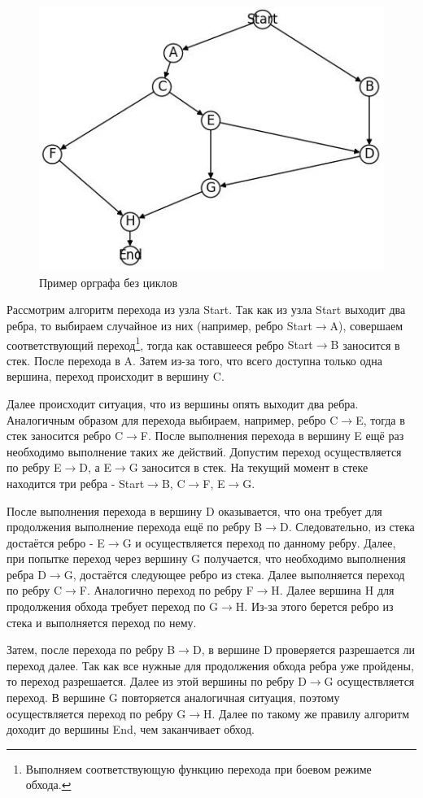 \begin{figure}[h]
    \centering
    \includegraphics[width=0.55\linewidth]{ResearchNotes/rndhpc_alg_edt_2023_02_01/graph.jpg}
    \caption{Пример орграфа без циклов}
    \label{fig:graph}
\end{figure}

Рассмотрим алгоритм перехода из узла \textsf{Start}. Так как из узла \textsf{Start} выходит два ребра, то выбираем случайное из них (например, ребро \textsf{Start$\rightarrow$A}), совершаем соответствующий переход\footnote{Выполняем соответствующую функцию перехода при \flqq боевом \frqq режиме обхода.}, тогда как оставшееся ребро \textsf{Start$\rightarrow$B} заносится в стек. После перехода в \textsf{A}.  Затем из-за того, что всего доступна только одна вершина, переход происходит в вершину \textsf{C}.

Далее происходит ситуация, что из вершины опять выходит два ребра. Аналогичным образом для перехода выбираем, например, ребро \textsf{C$\rightarrow$E}, тогда в стек заносится ребро \textsf{C$\rightarrow$F}. После выполнения перехода в вершину \textsf{E} ещё раз необходимо выполнение таких же действий. Допустим переход осуществляется по ребру \textsf{E$\rightarrow$D}, а \textsf{E$\rightarrow$G} заносится в стек. На текущий момент в стеке находится три ребра - \textsf{Start$\rightarrow$B}, \textsf{C$\rightarrow$F}, \textsf{E$\rightarrow$G}.

После выполнения перехода в вершину \textsf{D} оказывается, что она требует для продолжения выполнение перехода ещё по ребру \textsf{B$\rightarrow$D}. Следовательно, из стека достаётся ребро - \textsf{E$\rightarrow$G} и осуществляется переход по данному ребру. Далее, при попытке переход через вершину \textsf{G} получается, что необходимо выполнения ребра \textsf{D$\rightarrow$G}, достаётся следующее ребро из стека. Далее выполняется переход по ребру \textsf{C$\rightarrow$F}. Аналогично переход по ребру \textsf{F$\rightarrow$H}. Далее вершина \textsf{H} для продолжения обхода требует переход по \textsf{G$\rightarrow$H}. Из-за этого берется ребро из стека и выполняется переход по нему.

Затем, после перехода по ребру \textsf{B$\rightarrow$D}, в вершине \textsf{D} проверяется разрешается ли переход далее. Так как все нужные для продолжения обхода ребра уже пройдены, то переход разрешается. Далее из этой вершины по ребру \textsf{D$\rightarrow$G} осуществляется переход. В вершине \textsf{G} повторяется аналогичная ситуация, поэтому осуществляется переход по ребру \textsf{G$\rightarrow$H}. Далее по такому же правилу алгоритм доходит до вершины \textsf{End}, чем заканчивает обход.

\noteattributes{} 